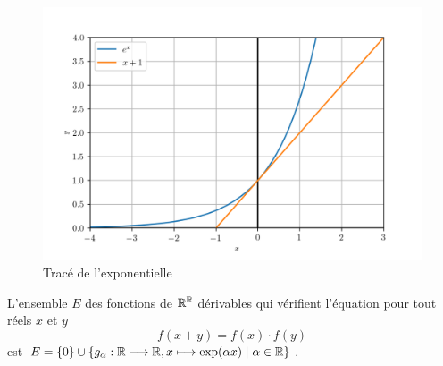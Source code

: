\begin{figure}
    \centering
    \includegraphics[scale = 1.0]{exp.png}
    \caption{Tracé de l'exponentielle}
    \label{fig:traceexp}
\end{figure}

\begin{theo}
    L'ensemble \(E\) des fonctions de \(\mathbb{R}^{\mathbb{R}}\) dérivables qui vérifient 
    l'équation pour tout réels \(x\) et \(y\)
    \begin{equation}
        \label{eq:foncexp}
        f(x+y) = f(x) \cdot f(y)
    \end{equation}
    est \(E = \left\{0\right\} \cup \left\{g_{\alpha}:\mathbb{R} \longrightarrow \mathbb{R}, x \longmapsto \exp(\alpha x)\mathrel{}\middle|\mathrel{}\alpha \in 
        \mathbb{R}\right\}\).
\end{theo}

